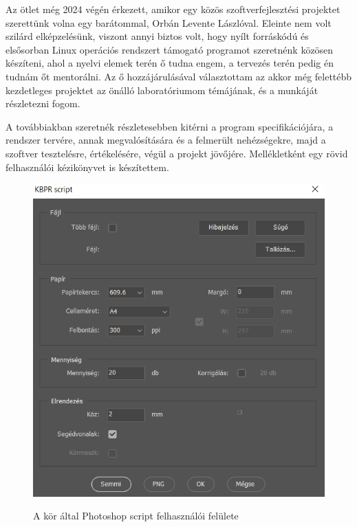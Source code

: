 Az ötlet még 2024 végén érkezett, amikor egy közös szoftverfejlesztési projektet szerettünk volna egy barátommal, Orbán Levente Lászlóval. Eleinte nem volt szilárd elképzelésünk, viszont annyi biztos volt, hogy nyílt forráskódú és elsősorban Linux operációs rendszert támogató programot szeretnénk közösen készíteni, ahol a nyelvi elemek terén ő tudna engem, a tervezés terén pedig én tudnám őt mentorálni. Az ő hozzájárulásával választottam az akkor még felettébb kezdetleges projektet az önálló laboratóriumom témájának, és a munkáját részletezni fogom.

\break

A továbbiakban szeretnék részletesebben kitérni a program specifikációjára, a rendszer tervére, annak megvalósítására és a felmerült nehézségekre, majd a szoftver tesztelésre, értékelésére, végül a projekt jövőjére. Mellékletként egy rövid felhasználói kézikönyvet is készítettem.

\begin{figure}[h]
    \includegraphics[width=\textwidth]{figures/script_showcase.png}
    \label{fig:old_ui}
    \caption{A kör által Photoshop script felhasználói felülete}
\end{figure}